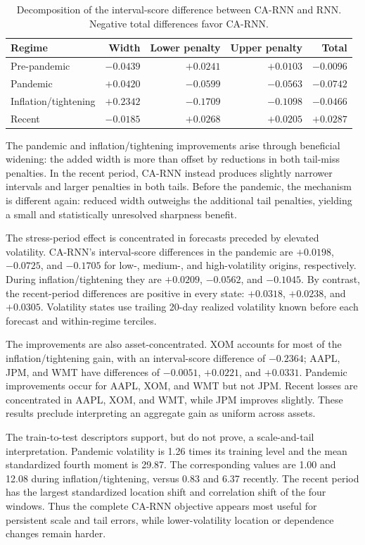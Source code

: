 \documentclass[11pt]{article}
\begin{document}
\begin{table}[ht]
\centering
\caption{Decomposition of the interval-score difference between CA-RNN and RNN.
Negative total differences favor CA-RNN.}
\label{tab:interval-mechanism}
\begin{tabular}{lrrrr}
\toprule
Regime & Width & Lower penalty & Upper penalty & Total \\
\midrule
Pre-pandemic & $-0.0439$ & $+0.0241$ & $+0.0103$ & $-0.0096$ \\
Pandemic & $+0.0420$ & $-0.0599$ & $-0.0563$ & $-0.0742$ \\
Inflation/tightening & $+0.2342$ & $-0.1709$ & $-0.1098$ & $-0.0466$ \\
Recent & $-0.0185$ & $+0.0268$ & $+0.0205$ & $+0.0287$ \\
\bottomrule
\end{tabular}
\end{table}

The pandemic and inflation/tightening improvements arise through beneficial
widening: the added width is more than offset by reductions in both tail-miss
penalties. In the recent period, CA-RNN instead produces slightly
narrower intervals and larger penalties in both tails. Before the pandemic, the
mechanism is different again: reduced width outweighs the additional tail
penalties, yielding a small and statistically unresolved sharpness benefit.

The stress-period effect is concentrated in forecasts preceded by elevated
volatility. CA-RNN's interval-score differences in the pandemic are
$+0.0198$, $-0.0725$, and $-0.1705$ for low-, medium-, and high-volatility
origins, respectively. During inflation/tightening they are $+0.0209$, $-0.0562$,
and $-0.1045$. By contrast, the recent-period differences are positive in every
state: $+0.0318$, $+0.0238$, and $+0.0305$. Volatility states use trailing 20-day
realized volatility known before each forecast and within-regime terciles.

The improvements are also asset-concentrated. XOM accounts for most of the
inflation/tightening gain, with an interval-score difference of $-0.2364$;
AAPL, JPM, and WMT have differences of $-0.0051$, $+0.0221$, and $+0.0331$.
Pandemic improvements occur for AAPL, XOM, and WMT but not JPM. Recent losses are
concentrated in AAPL, XOM, and WMT, while JPM improves slightly. These results
preclude interpreting an aggregate gain as uniform across assets.

The train-to-test descriptors support, but do not prove, a scale-and-tail
interpretation. Pandemic volatility is 1.26 times its training level and the mean
standardized fourth moment is 29.87. The corresponding values are 1.00 and 12.08
during inflation/tightening, versus 0.83 and 6.37 recently. The recent period has
the largest standardized location shift and correlation shift of the four
windows. Thus the complete CA-RNN objective appears most useful for persistent
scale and tail errors, while lower-volatility location or dependence changes
remain harder.
\end{document}

